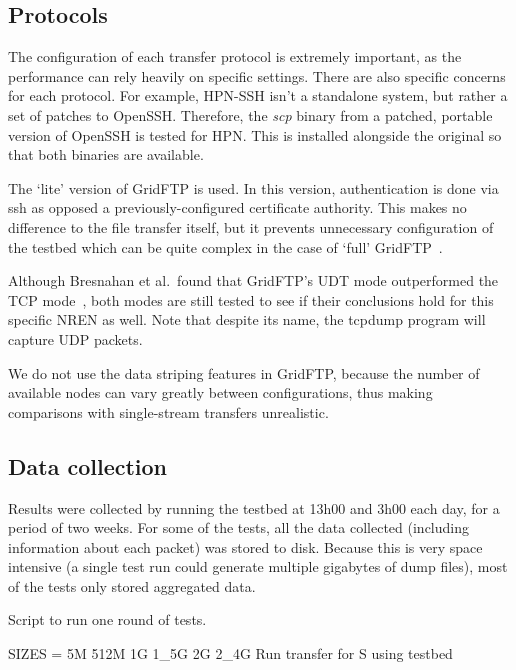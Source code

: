 \documentclass{sig-alternate-05-2015}
\begin{document}
\subsection{Protocols}
The configuration of each transfer protocol is extremely important, as the performance can rely heavily on specific settings. There are also specific concerns for each protocol. For example, HPN-SSH isn't a standalone system, but rather a set of patches to OpenSSH. Therefore, the \textit{scp} binary from a patched, portable version of OpenSSH is tested for HPN\@. This is installed alongside the original so that both binaries are available.

The `lite' version of GridFTP is used. In this version, authentication is done via ssh as opposed a previously-configured certificate authority. This makes no difference to the file transfer itself, but it prevents unnecessary configuration of the testbed which can be quite complex in the case of `full' GridFTP~\cite{gridftplite}.

Although Bresnahan et al.\ found that GridFTP's UDT mode outperformed the TCP mode~\cite{bresnahan2009udt}, both modes are still tested to see if their conclusions hold for this specific NREN as well. Note that despite its name, the tcpdump program will capture UDP packets.

We do not use the data striping features in GridFTP, because the number of available nodes can vary greatly between configurations, thus making comparisons with single-stream transfers unrealistic.

\subsection{Data collection}
Results were collected by running the testbed at 13h00 and 3h00 each day, for a period of two weeks. For some of the tests, all the data collected (including information about each packet) was stored to disk. Because this is very space intensive (a single test run could generate multiple gigabytes of dump files), most of the tests only stored aggregated data. 

\begin{algorithm}[h]
\caption{Script to run one round of tests.}
	\begin{algorithmic}
		\STATE SIZES = 5M 512M 1G 1\_5G 2G 2\_4G
		\STATE Run transfer for S using testbed
		\ENDFOR
		\ENDFOR
	\end{algorithmic}
\label{alg:script}
\end{algorithm}
\end{document}
